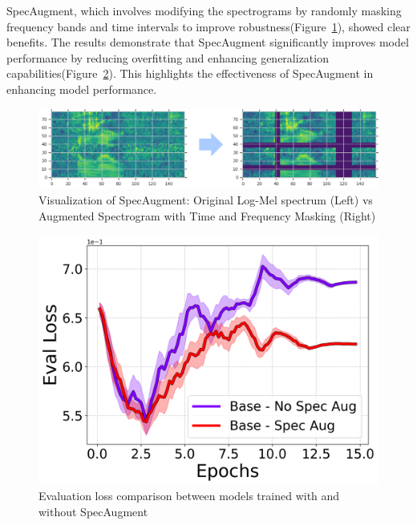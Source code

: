\documentclass[10pt,twocolumn,letterpaper]{article}
\begin{document}
SpecAugment, which involves modifying the spectrograms by randomly masking frequency bands and time intervals to improve robustness(Figure~\ref{fig:spec-augment})\cite{SpecAugment}, showed clear benefits. The results demonstrate that SpecAugment significantly improves model performance by reducing overfitting and enhancing generalization capabilities(Figure~\ref{fig:spec_aug_comparison}). This highlights the effectiveness of SpecAugment in enhancing model performance.

\begin{figure}
    \centering
    \includegraphics[width=1.0\linewidth]{./spec_augment.png}
    \caption{Visualization of SpecAugment: Original Log-Mel spectrum (Left) vs Augmented Spectrogram with Time and Frequency Masking (Right)}
    \label{fig:spec-augment}
\end{figure}

\begin{figure}[t]
    \centering
    \includegraphics[width=0.8\linewidth]{./base_spec_eval/eval_loss_line.png}
    \caption{Evaluation loss comparison between models trained with and without SpecAugment}
    \label{fig:spec_aug_comparison}
\end{figure}
\end{document}

